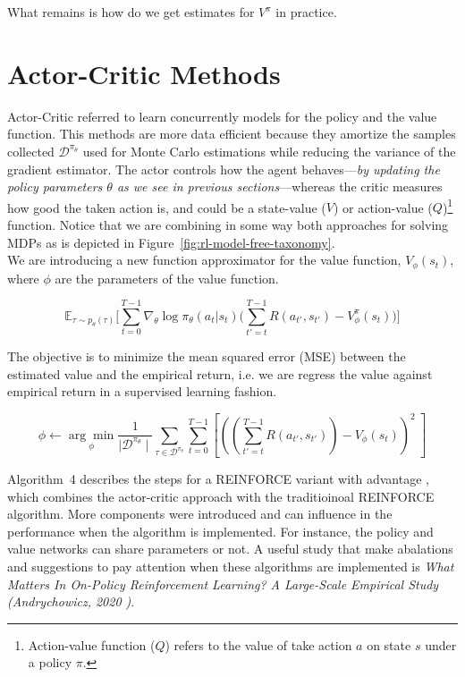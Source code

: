 \noindent What remains is how do we get estimates for $V^{\pi}$ in practice.

\section{Actor-Critic Methods}

Actor-Critic referred to learn concurrently models for the policy and the value function. This methods are more data efficient because they amortize the samples collected $\mathcal{D}^{\pi_{\theta}}$ used for Monte Carlo estimations while reducing the variance of the gradient estimator. The actor controls how the agent behaves---\textit{by updating the policy parameters $\theta$ as we see in previous sections}---whereas the critic measures how good the taken action is, and could be a state-value ($V$) or action-value ($Q$)\footnote{Action-value function ($Q$) refers to the value of take action $a$ on state $s$ under a policy $\pi$.} function. Notice that we are combining in some way both approaches for solving MDPs as is depicted in Figure~\ref{fig:rl-model-free-taxonomy}.\\

\noindent We are introducing a new function approximator for the value function, $V_{\phi}(s_{t})$, where $\phi$ are the parameters of the value function. 

\begin{equation}\label{eqn:actor-critic-objective}
    \mathbb{E}_{\tau\sim p_{\theta}(\tau)} \bigg[\sum_{t=0}^{T-1}\nabla_{\theta}\log\pi_{\theta}(a_{t}|s_{t}) \bigg( \sum_{t'=t}^{T-1} R(a_{t'}, s_{t'}) - V_{\phi}^{\pi}(s_{t}) \bigg) \bigg]
\end{equation}

\noindent The objective is to minimize the mean squared error (MSE) between the estimated value and the empirical return, i.e. we are regress the value against empirical return in a supervised learning fashion. 

\begin{equation}\label{eqn:value-function-loss}
   \phi \leftarrow \underset{\phi}{\arg\min} \frac{1}{\mid\mathcal{D}^{\pi_{\theta}}\mid}\sum_{\tau\in\mathcal{D}^{\pi_{\theta}}}\sum_{t=0}^{T-1}\left[\left(\left(\sum_{t'=t}^{T-1} R(a_{t'}, s_{t'})\right) - V_{\phi}(s_{t})\right)^2~\right]
\end{equation}

\noindent Algorithm~4 describes the steps for a REINFORCE variant with advantage , which combines the actor-critic approach with the traditioinoal REINFORCE algorithm. More components were introduced and can influence in the performance when the algorithm is implemented. For instance, the policy and value networks can share parameters or not. A useful study that make abalations and suggestions to pay attention when these algorithms are implemented is \textit{What Matters In On-Policy Reinforcement Learning? A Large-Scale Empirical Study (Andrychowicz, 2020 \cite{andrychowicz2020mattersonpolicyreinforcementlearning})}.\\

